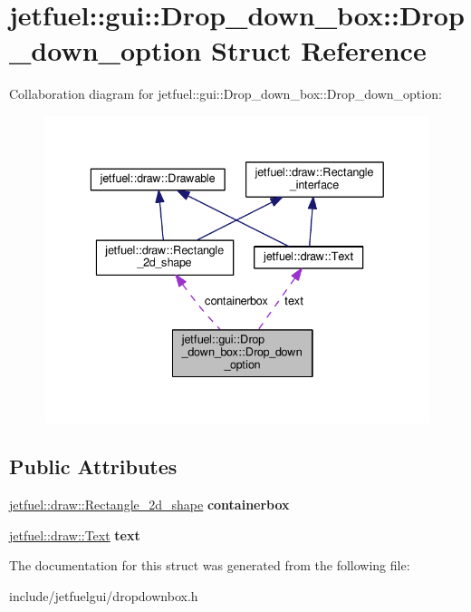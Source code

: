 \hypertarget{structjetfuel_1_1gui_1_1Drop__down__box_1_1Drop__down__option}{}\section{jetfuel\+:\+:gui\+:\+:Drop\+\_\+down\+\_\+box\+:\+:Drop\+\_\+down\+\_\+option Struct Reference}
\label{structjetfuel_1_1gui_1_1Drop__down__box_1_1Drop__down__option}


Collaboration diagram for jetfuel\+:\+:gui\+:\+:Drop\+\_\+down\+\_\+box\+:\+:Drop\+\_\+down\+\_\+option\+:
\nopagebreak
\begin{figure}[H]
\begin{center}
\leavevmode
\includegraphics[width=336pt]{structjetfuel_1_1gui_1_1Drop__down__box_1_1Drop__down__option__coll__graph}
\end{center}
\end{figure}
\subsection*{Public Attributes}
\begin{DoxyCompactItemize}
\item 
\mbox{\label{structjetfuel_1_1gui_1_1Drop__down__box_1_1Drop__down__option_a51183cc19b7ddff4e3fcefe46444b306}} 
\hyperlink{classjetfuel_1_1draw_1_1Rectangle__2d__shape}{jetfuel\+::draw\+::\+Rectangle\+\_\+2d\+\_\+shape} {\bfseries containerbox}
\item 
\mbox{\label{structjetfuel_1_1gui_1_1Drop__down__box_1_1Drop__down__option_aa007a6149c65af3128c930254365c7b5}} 
\hyperlink{classjetfuel_1_1draw_1_1Text}{jetfuel\+::draw\+::\+Text} {\bfseries text}
\end{DoxyCompactItemize}


The documentation for this struct was generated from the following file\+:\begin{DoxyCompactItemize}
\item 
include/jetfuelgui/dropdownbox.\+h\end{DoxyCompactItemize}
